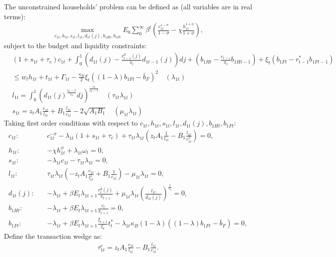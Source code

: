 \documentclass[12pt]{article}
\begin{document}
The unconstrained households' problem can be defined as (all variables are in real terms):
\begin{align*}
\max_{c_{1t}, h_{1t},s_{1t},l_{1t},d_{1t}(j),b_{1Ht},b_{1Ft}} E_0 \sum_0^{\infty}\beta^t (\frac{c_{1t}^{1-\sigma}}{1-\sigma}-\chi\frac{h_{1t}^{1+\phi}}{1+\phi}),
\end{align*}
subject to the budget and liquidity constraints:
\begin{align*} 
&(1+s_{1t}+\tau_c)c_{1t}+\int_0^1(d_{1t}(j)-\frac{r_{t-1}^d(j)}{\pi_t}d_{1t-1}(j))dj +(b_{1Ht}-\frac{r_{t-1}}{\pi_t}b_{1Ht-1})+\xi_t(b_{1Ft}-r^*_{t-1}b_{1Ft-1}) \\
&\leq w_th_{1t}+t_{1t}+\Gamma_{1t}-\frac{\kappa_B}{2}\xi_t((1-\lambda)b_{1Ft}-\bar{b}_F)^2 \quad (\lambda_{1t}) \\
&l_{1t} = \int_0^1({d_{1t}(j)}^{\frac{\epsilon_b-1}{\epsilon_b}}dj)^{\frac{\epsilon_b}{\epsilon_b-1}} \quad (\tau_{1t}\lambda_{1t}) \\
&s_{1t} = z_tA_1\frac{c_{1t}}{l_{1t}}+B_1\frac{l_{1t}}{c_{1t}}-2\sqrt{A_1B_1}  \quad (\mu_{1t}\lambda_{1t})
\end{align*}
Taking first order conditions with respect to $c_{1t}, h_{1t}, s_{1t}, l_{1t}, d_{1t}(j), b_{1Ht}, b_{1Ft}$: 
\begin{align}
\label{c1}
c_{1t}: \quad &c_{1t}^{-\sigma}-\lambda_{1t}(1+s_{1t}+\tau_c)+\tau_{1t}\lambda_{1t}(z_tA_1\frac{1}{l_{1t}}-B_1\frac{l_{1t}}{c_{1t}^2}) = 0, \\
\label{h1}
h_{1t}: \quad &-\chi h_{1t}^{\phi}+\lambda_{1t}\omega_t  = 0, \\
\label{s1}
s_{1t}: \quad &-\lambda_{1t}c_{1t}-\tau_{1t}\lambda_{1t} = 0, \\
\label{l1}
l_{1t}: \quad &\tau_{1t}\lambda_{1t}(-z_tA_1\frac{c_{1t}}{l_{1t}^2}+B_1\frac{1}{c_{1t}})-\mu_{1t}\lambda_{1t} = 0, \\
\label{d1j}
d_{1t}(j): \quad &-\lambda_{1t}+\beta E_t\lambda_{1t+1}\frac{r_{t}^d(j)}{\pi_{t+1}}+\mu_{1t}\lambda_{1t}(\frac{l_{1t}}{d_{1t}(j)})^{\frac{1}{\epsilon_b}} = 0, \\
\label{b1H}
b_{1Ht}: \quad &-\lambda_{1t}+\beta E_t\lambda_{1t+1}\frac{r_t}{\pi_{t+1}} = 0, \\
\label{b1F}
b_{1Ft}: \quad &-\lambda_{1t}+\beta E_t\lambda_{1t+1}\frac{\xi_{t+1}}{\xi_t}t_t^*-\lambda_{1t}\kappa_B(1-\lambda)((1-\lambda)b_{1Ft}-\bar{b}_F) = 0,
\end{align}
Define the transaction wedge as:
\begin{align}
\label{tau1c}
\tau_{1t}^c = z_tA_1\frac{c_{1t}}{l_{1t}}-B_1\frac{l_{1t}}{c_{1t}}.
\end{align}
\end{document}
